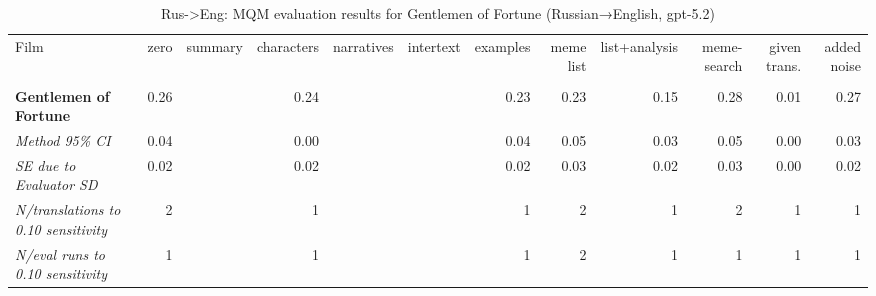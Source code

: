 \begin{table}[ht]
\centering
\begin{adjustbox}{width=\textwidth}
\begin{tabular}{lrrrrrrrrr|rr}
Film & zero & summary & characters & narratives & intertext & examples & meme list & list+analysis & meme-search & \multicolumn{1}{|r}{given trans.} & added noise \\
 &  &  &  &  &  &  &  &  &  &  &  \\
\hline
\textbf{Gentlemen of Fortune} & 0.26 &  & 0.24 &  &  & 0.23 & 0.23 & 0.15 & 0.28 & 0.01 & 0.27 \\

\emph{Method 95\% CI} & 0.04 &  & 0.00 &  &  & 0.04 & 0.05 & 0.03 & 0.05 & 0.00 & 0.03 \\

\emph{SE due to Evaluator SD} & 0.02 &  & 0.02 &  &  & 0.02 & 0.03 & 0.02 & 0.03 & 0.00 & 0.02 \\

\emph{N/translations to 0.10 sensitivity} & 2 &  & 1 &  &  & 1 & 2 & 1 & 2 & 1 & 1 \\

\emph{N/eval runs to 0.10 sensitivity} & 1 &  & 1 &  &  & 1 & 2 & 1 & 1 & 1 & 1 \\

\hline
\end{tabular}
\end{adjustbox}
\caption{Rus->Eng: MQM evaluation results for Gentlemen of Fortune (Russian→English, gpt-5.2)}
\label{tab:gentelmen-eng}
\end{table}
